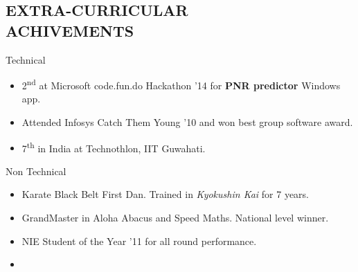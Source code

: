 \documentclass[margin, 10pt]{res} %
\begin{document}
\begin{resume}
\section{EXTRA-CURRICULAR \\ ACHIVEMENTS} 
Technical
\begin{itemize}\itemsep -13pt
\item2\textsuperscript{nd} at Microsoft code.fun.do Hackathon '14 for \textbf{PNR predictor} Windows app.\\
\item Attended Infosys Catch Them Young '10 and won best group software award.\\
\item 7\textsuperscript{th} in India at Technothlon, IIT Guwahati.
\end{itemize}
Non Technical 
\begin{itemize}\itemsep -13pt
\item Karate Black Belt First Dan. Trained in \textit{Kyokushin Kai} for 7 years.\\
\item GrandMaster in Aloha Abacus and Speed Maths. National level winner.\\
\item NIE Student of the Year '11 for all round performance.
\item 
\end{itemize}


\end{resume}
\end{document}
